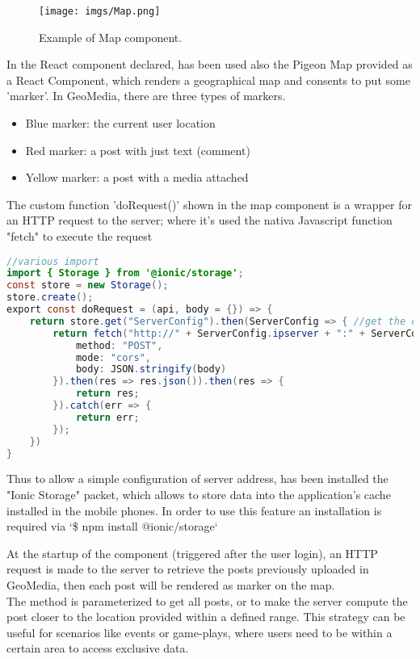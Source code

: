 \documentclass[conference]{IEEEtran}
\begin{document}
\begin{figure}[htbp]
\begin{center}
{\texttt{[image: imgs/Map.png]}}
\end{center}
\caption{Example of Map component.}
\label{fig}
\end{figure}


In the React component declared, has been used also the Pigeon Map\cite{b8} provided as a React Component, which renders a geographical map and consents to put some 'marker'.
In GeoMedia, there are three types of markers.
\begin{itemize}
\item Blue marker: the current user location
\item Red marker: a post with just text (comment)
\item Yellow marker: a post with a media attached 
\end{itemize}

The custom function 'doRequest()' shown in the map component is a wrapper for an HTTP request to the server; where it's used the nativa Javascript function "fetch" to execute the request
\begin{lstlisting}[language=Java, description=Method doRequest to fetch server]
//various import 
import { Storage } from '@ionic/storage';
const store = new Storage();
store.create();
export const doRequest = (api, body = {}) => {
    return store.get("ServerConfig").then(ServerConfig => { //get the configuration stored in the cache of the mobile phone
        return fetch("http://" + ServerConfig.ipserver + ":" + ServerConfig.port + "/" + api, {
            method: "POST",
            mode: "cors",
            body: JSON.stringify(body)
        }).then(res => res.json()).then(res => {
            return res;
        }).catch(err => {
            return err;
        });
    })
}
\end{lstlisting}


Thus to allow a simple configuration of server address, has been installed the "Ionic Storage"\cite{b9} packet, which allows to store data into the application's cache installed in the mobile phones. In order to use this feature an installation is required via `\$ npm install @ionic/storage`


At the startup of the component (triggered after the user login), an HTTP request is made to the server to retrieve the posts previously uploaded in GeoMedia, then each post will be rendered as marker on the map.
\\
The method is parameterized to get all posts, or to make the server compute the post closer to the location provided within a defined range.
This strategy can be useful for scenarios like events or game-plays, where users need to be  within a certain area to access exclusive data.
\end{document}
